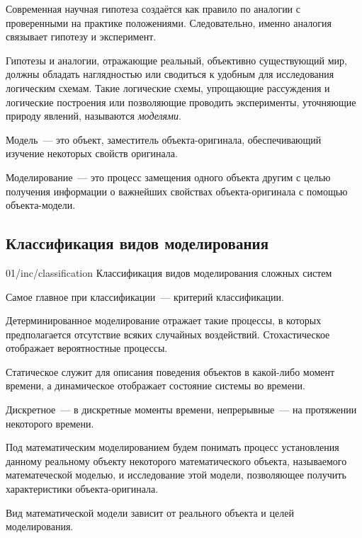 Современная научная гипотеза создаётся как правило по аналогии с проверенными на практике положениями. Следовательно, именно аналогия связывает гипотезу и эксперимент.

Гипотезы и аналогии, отражающие реальный, объективно существующий мир, должны обладать наглядностью или сводиться к удобным для исследования логическим схемам. Такие логические схемы, упрощающие рассуждения и логические построения или позволяющие проводить эксперименты, уточняющие природу явлений, называются \textit{моделями}.

\begin{dd}
    Модель~--- это объект, заместитель объекта-оригинала, обеспечивающий изучение некоторых свойств оригинала.
\end{dd}

\begin{dd}
    Моделирование~--- это процесс замещения одного объекта другим с целью получения информации о важнейших свойствах объекта-оригинала с помощью объекта-модели.
\end{dd}

\subsection{Классификация видов моделирования}

\image
{\textwidth}
{01/inc/classification}
{Классификация видов моделирования сложных систем}

Самое главное при классификации~--- критерий классификации.

Детерминированное моделирование отражает такие процессы, в которых предполагается отсутствие всяких случайных воздействий. Стохастическое отображает вероятностные процессы.

Статическое служит для описания поведения объектов в какой-либо момент времени, а динамическое отображает состояние системы во времени.

Дискретное~--- в дискретные моменты времени, непрерывные~--- на протяжении некоторого времени.

\begin{dd}
    Под математическим моделированием будем понимать процесс установления данному реальному объекту некоторого математического объекта, называемого математеческой моделью, и исследование этой модели, позволяющее получить характеристики объекта-оригинала.
\end{dd}

Вид математической модели зависит от реального объекта и целей моделирования.

